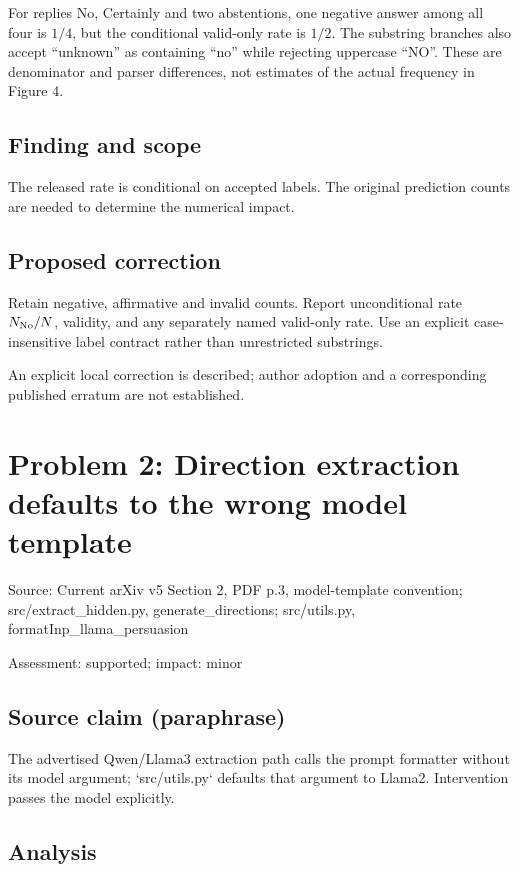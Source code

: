 \documentclass[11pt]{article}
\begin{document}
For replies No, Certainly and two abstentions, one negative answer among all four is \(1/4\), but the conditional valid-only rate is \(1/2\). The substring branches also accept “unknown” as containing “no” while rejecting uppercase “NO”. These are denominator and parser differences, not estimates of the actual frequency in Figure 4.

\subsection*{Finding and scope}

The released rate is conditional on accepted labels. The original prediction counts are needed to determine the numerical impact.

\subsection*{Proposed correction}

Retain negative, affirmative and invalid counts. Report unconditional rate \(N_{\rm No}/N\), validity, and any separately named valid-only rate. Use an explicit case-insensitive label contract rather than unrestricted substrings.

An explicit local correction is described; author adoption and a corresponding published erratum are not established.

\section*{Problem 2: Direction extraction defaults to the wrong model template}

Source: Current arXiv v5 Section 2, PDF p.3, model-template convention; src/extract\_hidden.py, generate\_directions; src/utils.py, formatInp\_llama\_persuasion

Assessment: supported; impact: minor

\subsection*{Source claim (paraphrase)}

The advertised Qwen/Llama3 extraction path calls the prompt formatter without its model argument; `src/utils.py` defaults that argument to Llama2. Intervention passes the model explicitly.

\subsection*{Analysis}
\end{document}

